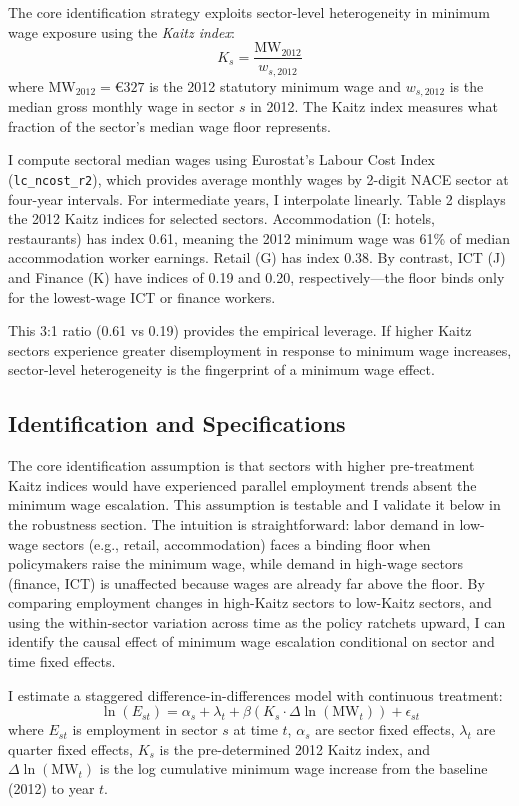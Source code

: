 \documentclass[12pt]{article}
\begin{document}
The core identification strategy exploits sector-level heterogeneity in minimum wage exposure using the \textit{Kaitz index}:
$$
K_s = \frac{\text{MW}_{2012}}{w_{s,2012}}
$$
where $\text{MW}_{2012} = €327$ is the 2012 statutory minimum wage and $w_{s,2012}$ is the median gross monthly wage in sector $s$ in 2012. The Kaitz index measures what fraction of the sector's median wage floor represents.

I compute sectoral median wages using Eurostat's Labour Cost Index (\texttt{lc\_ncost\_r2}), which provides average monthly wages by 2-digit NACE sector at four-year intervals. For intermediate years, I interpolate linearly. Table 2 displays the 2012 Kaitz indices for selected sectors. Accommodation (I: hotels, restaurants) has index 0.61, meaning the 2012 minimum wage was 61\% of median accommodation worker earnings. Retail (G) has index 0.38. By contrast, ICT (J) and Finance (K) have indices of 0.19 and 0.20, respectively—the floor binds only for the lowest-wage ICT or finance workers.

This 3:1 ratio (0.61 vs 0.19) provides the empirical leverage. If higher Kaitz sectors experience greater disemployment in response to minimum wage increases, sector-level heterogeneity is the fingerprint of a minimum wage effect.

\subsection{Identification and Specifications}

The core identification assumption is that sectors with higher pre-treatment Kaitz indices would have experienced parallel employment trends absent the minimum wage escalation. This assumption is testable and I validate it below in the robustness section. The intuition is straightforward: labor demand in low-wage sectors (e.g., retail, accommodation) faces a binding floor when policymakers raise the minimum wage, while demand in high-wage sectors (finance, ICT) is unaffected because wages are already far above the floor. By comparing employment changes in high-Kaitz sectors to low-Kaitz sectors, and using the within-sector variation across time as the policy ratchets upward, I can identify the causal effect of minimum wage escalation conditional on sector and time fixed effects.

I estimate a staggered difference-in-differences model with continuous treatment:
$$
\ln(E_{st}) = \alpha_s + \lambda_t + \beta \left( K_s \cdot \Delta \ln(\text{MW}_t) \right) + \epsilon_{st}
$$
where $E_{st}$ is employment in sector $s$ at time $t$, $\alpha_s$ are sector fixed effects, $\lambda_t$ are quarter fixed effects, $K_s$ is the pre-determined 2012 Kaitz index, and $\Delta \ln(\text{MW}_t)$ is the log cumulative minimum wage increase from the baseline (2012) to year $t$.
\end{document}
